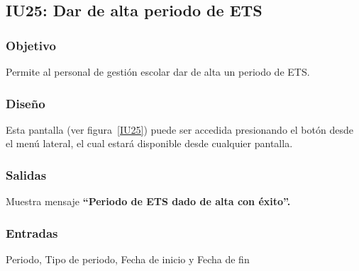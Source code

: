 
\subsection{IU25: Dar de alta periodo de ETS}
\subsubsection{Objetivo}
    Permite al personal de gestión escolar dar de alta un periodo de ETS.
\subsubsection{Diseño}
    Esta pantalla  (ver figura~\ref{IU25}) puede ser accedida presionando el botón  desde el menú lateral, el cual estará disponible desde cualquier pantalla. 
    

\subsubsection{Salidas}
Muestra mensaje {\bf ``Periodo de ETS  dado de alta con éxito''.}
\subsubsection{Entradas}
Periodo, Tipo de periodo, Fecha de inicio y Fecha de fin

